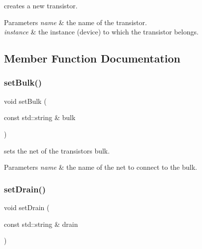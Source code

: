 creates a new transistor. 


\begin{DoxyParams}{Parameters}
{\em name} & the name of the transistor. \\
\hline
{\em instance} & the instance (device) to which the transistor belongs. \\
\hline
\end{DoxyParams}


\subsection{Member Function Documentation}
\mbox{\label{class_open_chams_1_1_transistor_a1484abe63e3f8ffbc2911c5230fa7091}} 
\subsubsection{\texorpdfstring{set\+Bulk()}{setBulk()}}
{\footnotesize\ttfamily void set\+Bulk (\begin{DoxyParamCaption}\item[{const std\+::string \&}]{bulk }\end{DoxyParamCaption})}



sets the net of the transistor\textquotesingle{}s bulk. 


\begin{DoxyParams}{Parameters}
{\em name} & the name of the net to connect to the bulk. \\
\hline
\end{DoxyParams}
\mbox{\label{class_open_chams_1_1_transistor_a72ff8491040e3fdc1c8bd62b2392ab82}} 
\subsubsection{\texorpdfstring{set\+Drain()}{setDrain()}}
{\footnotesize\ttfamily void set\+Drain (\begin{DoxyParamCaption}\item[{const std\+::string \&}]{drain }\end{DoxyParamCaption})}



